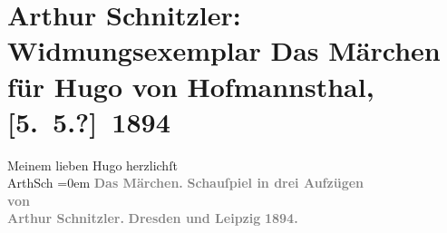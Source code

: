 

         
         \renewcommand{\erwaehntePersonen}{Personen: Hugo von Hofmannsthal}
         \renewcommand{\erwaehnteInstitutionen}{Institutionen: E. Pierson’s Verlag}
         \renewcommand{\erwaehnteOrte}{Orte: Dresden, Leipzig, Wien}
         \renewcommand{\erwaehnteWerke}{Werke: Das Märchen. Schauspiel in drei Aufzügen}
               \section[Arthur Schnitzler: Widmungsexemplar Das Märchen für Hugo von Hofmannsthal, {[}5. 5.?{]} 1894]{ Arthur Schnitzler: Widmungsexemplar Das Märchen für Hugo von
                    Hofmannsthal, {[}5. 5.?{]} 1894}\nopagebreak{}\rehead{ }\begin{ledgroupsized}[t]{13cm}\normalsize\beginnumbering \toendnotes[C]{\smallbreak\pagebreak[2]} 
\pstart
           \noindent{}{\pb}Meinem lieben Hugo\pend
           \pstart
           \hspace*{2.5em}herzlichſt{\\[\baselineskip]}\spacefill\mbox{ArthSch}\pend
           \leftskip=0em{}{\bigskip}\pstart
           \noindent{}\centering{}{\pb}\textcolor{gray}{\textbf{Das
                            Märchen.}}\pend
           \pstart
           \noindent{}\centering{}\textcolor{gray}{\textbf{Schauſpiel in drei Aufzügen}}{\\}\textcolor{gray}{\textbf{von}}{\\}\textcolor{gray}{\textbf{Arthur
                    Schnitzler.}}\pend
           {\bigskip}\pstart
           \noindent{}\centering{}\textcolor{gray}{\textbf{\textbf{Dresden} und \textbf{Leipzig}}}\pend
           \pstart
           \noindent{}\centering{}\textcolor{gray}{\textbf{}}\pend
           \pstart
           \noindent{}\centering{}\textcolor{gray}{\textbf{1894.}}\pend
           
         
         \endnumbering{}\end{ledgroupsized}  \newcommand{\dateiname}{L00320}\newcommand{\titel}{Arthur Schnitzler: Widmungsexemplar Das Märchen für Hugo von Hofmannsthal, [5. 5.?] 1894}\newcommand{\editorInnen}{Martin Anton Müller und Gerd-Hermann Susen}
      
